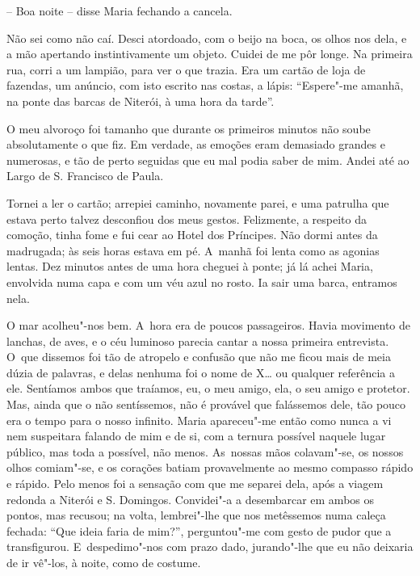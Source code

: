-- Boa noite -- disse Maria fechando a cancela.

Não sei como não caí. Desci atordoado, com o beijo na boca, os olhos nos
dela, e a mão apertando instintivamente um objeto. Cuidei de me pôr
longe. Na primeira rua, corri a um lampião, para ver o que trazia. Era
um cartão de loja de fazendas, um anúncio, com isto escrito nas costas,
a lápis: ``Espere"-me amanhã, na ponte das barcas de Niterói, à uma hora
da tarde''.

O meu alvoroço foi tamanho que durante os primeiros minutos não soube
absolutamente o que fiz. Em verdade, as emoções eram demasiado grandes e
numerosas, e tão de perto seguidas que eu mal podia saber de mim. Andei
até ao Largo de S. Francisco de Paula.

Tornei a ler o cartão; arrepiei caminho, novamente parei, e uma patrulha
que estava perto talvez desconfiou dos meus gestos. Felizmente, a
respeito da comoção, tinha fome e fui cear ao Hotel dos Príncipes. Não
dormi antes da madrugada; às seis horas estava em pé. A~manhã foi lenta
como as agonias lentas. Dez minutos antes de uma hora cheguei à ponte;
já lá achei Maria, envolvida numa capa e com um véu azul no rosto. Ia
sair uma barca, entramos nela.

O mar acolheu"-nos bem. A~hora era de poucos passageiros. Havia movimento
de lanchas, de aves, e o céu luminoso parecia cantar a nossa primeira
entrevista. O~que dissemos foi tão de atropelo e confusão que não me
ficou mais de meia dúzia de palavras, e delas nenhuma foi o nome de X\ldots{}
ou qualquer referência a ele. Sentíamos ambos que traíamos, eu, o meu
amigo, ela, o seu amigo e protetor. Mas, ainda que o não sentíssemos,
não é provável que falássemos dele, tão pouco era o tempo para o nosso
infinito. Maria apareceu"-me então como nunca a vi nem suspeitara falando
de mim e de si, com a ternura possível naquele lugar público, mas toda a
possível, não menos. As~nossas mãos colavam"-se, os nossos olhos
comiam"-se, e os corações batiam provavelmente ao mesmo compasso rápido e
rápido. Pelo menos foi a sensação com que me separei dela, após a viagem
redonda a Niterói e S. Domingos. Convidei"-a a desembarcar em ambos os
pontos, mas recusou; na volta, lembrei"-lhe que nos metêssemos numa
caleça fechada: ``Que ideia faria de mim?'', perguntou"-me com gesto de
pudor que a transfigurou. E~despedimo"-nos com prazo dado, jurando"-lhe
que eu não deixaria de ir vê"-los, à noite, como de costume.

